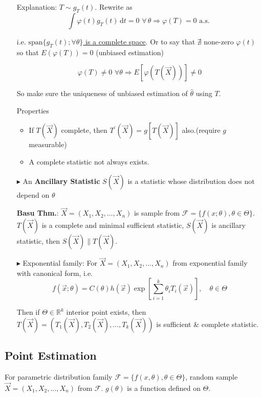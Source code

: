 \begin{itemize}
        Explanation: $T\sim g_T(t)$. Rewrite as
        \[
            \int\varphi (t) g_T(t)\,\mathrm{d} t=0  \,\,\forall\, \theta\Rightarrow\varphi(T)=0 \text{  a.s. }
        \]

        i.e. \underline{$\mathrm{span}\{g_T(t);\forall\theta\}$ is a complete space}. Or to say that $\nexists$ none-zero $\varphi(t)$ so that $E(\varphi(T))=0$ (unbiased estimation)

        \[
            \varphi(T)\neq 0 \,\,\forall \theta\Rightarrow E[\varphi(T(\vec{X}))]\neq 0  
        \]

        So make sure the uniqueness of unbiased estimation of $\hat{\theta}$ using $T$.

        Properties
        \begin{itemize}
            \item If $T(\vec{X})$ complete, then $T^\prime(\vec{X})=g[T(\vec{X})]$ also.(require $g$ measurable)

            \item A complete statistic not always exists.
        \end{itemize}
        \item[$\blacktriangleright$]  An \textbf{Ancillary Statistic} $S(\vec{X})$ is a statistic whose distribution does not depend on $\theta$
        
        \textbf{Basu Thm.}: $\vec{X}=(X_1,X_2,\ldots,X_n)$ is sample from $\mathscr{F}=\{f(x;\theta),\theta\in\Theta\}$. $T(\vec{X})$ is a complete and minimal sufficient statistic, $S(\vec{X})$ is ancillary statistic, then $S(\vec{X})\parallel T(\vec{X})$.

        \item[$\blacktriangleright$] Exponential family: For $\vec{X}=(X_1,X_2,\ldots,X_n)$ from exponential family with canonical form, i.e.
    \[
        f(\vec{x};\theta)=C(\theta)h(\vec{x})\exp\left[\sum_{i=1}^k \theta_i T_i(\vec{x})\right] ,\quad \theta\in\Theta
    \]

    Then if $\Theta\in\mathbb{R}^k$ interior point exists, then $T(\vec{X})=(T_1(\vec{X}),T_2(\vec{X}),\ldots,T_k(\vec{X}))$ is sufficient \& complete statistic.


\end{itemize} 




\subsection{Point Estimation}\label{SectionPointEstimation}
    For parametric distribution family $\mathscr{F}=\{f(x,\theta),\theta\in\Theta\}$, random sample $\vec{X}=(X_1,X_2,\ldots,X_n)$ from $\mathscr{F}$. $g(\theta)$ is a function defined on $\Theta$. 

